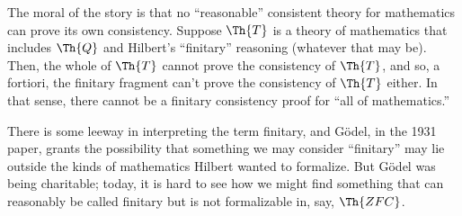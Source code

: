 \documentclass[../../include/open-logic-section]{subfiles}
\begin{document}
\begin{digress}
The moral of the story is that no ``reasonable'' consistent theory for
mathematics can prove its own consistency. Suppose $\Th{T}$ is a
theory of mathematics that includes $\Th{Q}$ and Hilbert's
``finitary'' reasoning (whatever that may be). Then, the whole of
$\Th{T}$ cannot prove the consistency of $\Th{T}$, and so, a fortiori,
the finitary fragment can't prove the consistency of $\Th{T}$
either. In that sense, there cannot be a finitary consistency proof
for ``all of mathematics.''

There is some leeway in interpreting the term finitary, and G\"odel, in
the 1931 paper, grants the possibility that something we may consider
``finitary'' may lie outside the kinds of mathematics Hilbert wanted
to formalize. But G\"odel was being charitable; today, it is hard to
see how we might find something that can reasonably be called finitary
but is not formalizable in, say, $\Th{ZFC}$.
\end{digress}
\end{document}
